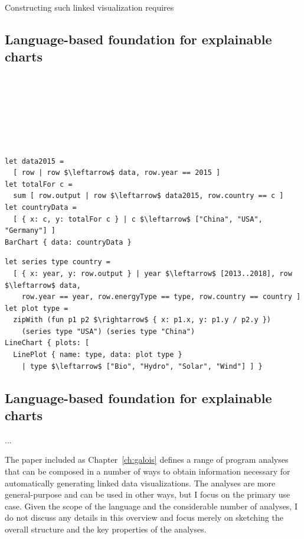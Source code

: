 \documentclass[fleqn,11pt]{report}
\theoremstyle{definition}
\begin{document}
Constructing such linked visualization requires

\newcommand*{\evalBwdR}[1]{{\mathrel{\rotatebox[origin=c]{45}{$\Rightarrow$}}}_{#1}}
\newcommand*{\evalFwdR}[1]{{\mathrel{\rotatebox[origin=c]{-45}{$\Rightarrow$}}}_{\hspace{-0.2em}#1}}
\newcommand*{\dual}[1]{{#1}^{\circ}}

\subsection{Language-based foundation for explainable charts}

~

~

~

~


\begin{lstlisting}[language=fluid,mathescape=true]
let data2015 =
  [ row | row $\leftarrow$ data, row.year == 2015 ]
let totalFor c =
  sum [ row.output | row $\leftarrow$ data2015, row.country == c ]
let countryData =
  [ { x: c, y: totalFor c } | c $\leftarrow$ ["China", "USA", "Germany"] ]
BarChart { data: countryData }
\end{lstlisting}

\begin{lstlisting}[language=fluid,mathescape=true]
let series type country =
  [ { x: year, y: row.output } | year $\leftarrow$ [2013..2018], row $\leftarrow$ data,
    row.year == year, row.energyType == type, row.country == country ]
let plot type =
  zipWith (fun p1 p2 $\rightarrow$ { x: p1.x, y: p1.y / p2.y })
    (series type "USA") (series type "China")
LineChart { plots: [
  LinePlot { name: type, data: plot type }
    | type $\leftarrow$ ["Bio", "Hydro", "Solar", "Wind"] ] }
\end{lstlisting}

\newpage

\subsection{Language-based foundation for explainable charts}

...

The paper included as Chapter~\ref{ch:galois} defines a range of program analyses that
can be composed in a number of ways to obtain information necessary for automatically
generating linked data visualizations. The analyses are more general-purpose and can be
used in other ways, but I focus on the primary use case. Given the scope of the language
and the considerable number of analyses, I do not discuss any details in this overview
and focus merely on sketching the overall structure and the key properties of the analyses.
\end{document}
